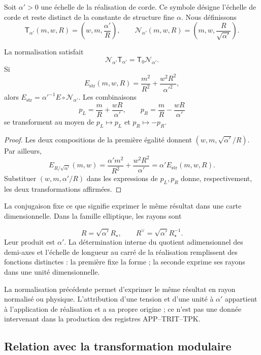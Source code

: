 Soit \(\alpha'>0\) une échelle de la réalisation de corde.
Ce symbole désigne l’échelle de corde et reste distinct
de la constante de structure fine \(\alpha\). Nous définissons
\begin{equation}
 \mathsf T_{\alpha'}(m,w,R)
 =\left(w,m,\frac{\alpha'}R\right),\qquad
 \mathcal N_{\alpha'}(m,w,R)
 =\left(m,w,\frac R{\sqrt{\alpha'}}\right).
 \label{x_reciprocidad:iv:eq:normalizacion-cuerda}
\end{equation}

\begin{theorem}
\label{x_reciprocidad:iv:thm:normalizacion-cuerda}
La normalisation satisfait
\[
 \mathcal N_{\alpha'}\mathsf T_{\alpha'}
 =\mathsf T_0\mathcal N_{\alpha'}.
\]
Si
\[
 E_{\mathrm{str}}(m,w,R)
 =\frac{m^2}{R^2}+\frac{w^2R^2}{\alpha'^2},
\]
alors
\(E_{\mathrm{str}}=\alpha'^{-1}E\circ\mathcal N_{\alpha'}\).
Les combinaisons
\[
 p_L=\frac mR+\frac{wR}{\alpha'},\qquad
 p_R=\frac mR-\frac{wR}{\alpha'}
\]
se transforment au moyen de \(p_L\mapsto p_L\) et \(p_R\mapsto-p_R\).
\end{theorem}
\begin{proof}
Les deux compositions de la première égalité donnent
\((w,m,\sqrt{\alpha'}/R)\). Par ailleurs,
\[
 E_{R/\sqrt{\alpha'}}(m,w)
 =\frac{\alpha'm^2}{R^2}+\frac{w^2R^2}{\alpha'}
 =\alpha'E_{\mathrm{str}}(m,w,R).
\]
Substituer \((w,m,\alpha'/R)\) dans les expressions de
\(p_L,p_R\) donne, respectivement, les deux transformations
affirmées.
\end{proof}

La conjugaison fixe ce que signifie exprimer le même résultat dans
une carte dimensionnelle. Dans la famille elliptique, les rayons sont

\[
 R=\sqrt{\alpha'}R_\star,\qquad
 R^\vee=\sqrt{\alpha'}R_\star^{-1}.
\]
Leur produit est \(\alpha'\). La détermination interne du quotient
adimensionnel des demi-axes et l’échelle de longueur au carré de la
réalisation remplissent des fonctions distinctes : la première fixe la forme ;
la seconde exprime ses rayons dans une unité dimensionnelle.

La normalisation précédente permet d’exprimer le même résultat en
rayon normalisé ou physique. L’attribution d’une tension et d’une
unité à \(\alpha'\) appartient à l’application de réalisation et a
sa propre origine ; ce n’est pas une donnée intervenant dans la production
des registres APP--TRIT--TPK.

\subsection{Relation avec la transformation modulaire}

